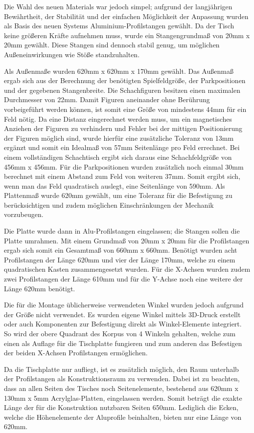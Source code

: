 Die Wahl des neuen Materials war jedoch simpel; aufgrund der
langjährigen Bewährtheit, der Stabilität und der einfachen Möglichkeit
der Anpassung wurden als Basis des neuen Systems Aluminium-Profilstangen
gewählt. Da der Tisch keine größeren Kräfte aufnehmen muss, wurde ein
Stangengrundmaß von 20mm x 20mm gewählt. Diese Stangen sind dennoch
stabil genug, um möglichen Außeneinwirkungen wie Stöße standzuhalten.

Als Außenmaße wurden 620mm x 620mm x 170mm gewählt. Das Außenmaß ergab
sich aus der Berechnung der benötigten Spielfeldgröße, der
Parkpositionen und der gegebenen Stangenbreite. Die Schachfiguren
besitzen einen maximalen Durchmesser von 22mm. Damit Figuren aneinander
ohne Berührung vorbeigeführt werden können, ist somit eine Größe von
mindestens 44mm für ein Feld nötig. Da eine Distanz eingerechnet werden
muss, um ein magnetisches Anziehen der Figuren zu verhindern und Fehler
bei der mittigen Positionierung der Figuren möglich sind, wurde hierfür
eine zusätzliche Toleranz von 13mm ergänzt und somit ein Idealmaß von
57mm Seitenlänge pro Feld errechnet. Bei einem vollständigen Schachtisch
ergibt sich daraus eine Schachfeldgröße von 456mm x 456mm. Für die
Parkpositionen wurden zusätzlich noch einmal 30mm berechnet mit einem
Abstand zum Feld von weiteren 37mm. Somit ergibt sich, wenn man das Feld
quadratisch auslegt, eine Seitenlänge von 590mm. Als Plattenmaß wurde
620mm gewählt, um eine Toleranz für die Befestigung zu berücksichtigen
und zudem möglichen Einschränkungen der Mechanik vorzubeugen.

Die Platte wurde dann in Alu-Profilstangen eingelassen; die Stangen
sollen die Platte umrahmen. Mit einem Grundmaß von 20mm x 20mm für die
Profilstangen ergab sich somit ein Gesamtmaß von 660mm x 660mm. Benötigt
wurden acht Profilstangen der Länge 620mm und vier der Länge 170mm,
welche zu einem quadratischen Kasten zusammengesetzt wurden. Für die
X-Achsen wurden zudem zwei Profilstangen der Länge 610mm und für die
Y-Achse noch eine weitere der Länge 620mm benötigt.

Die für die Montage üblicherweise verwendeten Winkel wurden jedoch
aufgrund der Größe nicht verwendet. Es wurden eigene Winkel mittels
3D-Druck erstellt oder auch Komponenten zur Befestigung direkt als
Winkel-Elemente integriert. So wird der obere Quadrant des Korpus von 4
Winkeln gehalten, welche zum einen als Auflage für die Tischplatte
fungieren und zum anderen das Befestigen der beiden X-Achsen
Profilstangen ermöglichen.

Da die Tischplatte nur aufliegt, ist es zusätzlich möglich, den Raum
unterhalb der Profilstangen als Konstruktionsraum zu verwenden. Dabei
ist zu beachten, dass an allen Seiten des Tisches noch Seitenelemente,
bestehend aus 620mm x 130mm x 5mm Acrylglas-Platten, eingelassen werden.
Somit beträgt die exakte Länge der für die Konstruktion nutzbaren Seiten
650mm. Lediglich die Ecken, welche die Höhenelemente der Aluprofile
beinhalten, bieten nur eine Länge von 620mm.

